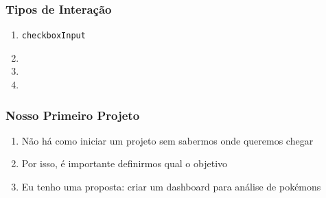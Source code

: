 \documentclass[12pt, compress, usetitleprogressbar]{beamer}\usepackage[]{graphicx}\usepackage[]{color}
\begin{document}

\begin{frame}

\frametitle{Tipos de Interação}

\begin{enumerate}[label=$\bullet$, leftmargin=*]

  \item \texttt{checkboxInput}

  \item \texttt{}

  \item \texttt{}

  \item \texttt{}

\end{enumerate}

\end{frame}





















\begin{frame}

\frametitle{Nosso Primeiro Projeto}

\begin{enumerate}[label=$\bullet$, leftmargin=*]

  \item Não há como iniciar um projeto sem sabermos onde queremos chegar

  \item Por isso, é importante definirmos qual o objetivo 

  \item Eu tenho uma proposta: criar um dashboard para análise de pokémons

\end{enumerate}

\end{frame}

\end{document}
